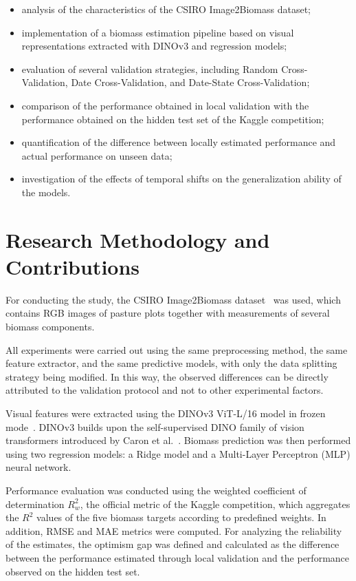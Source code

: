 \begin{itemize}
    \item analysis of the characteristics of the CSIRO Image2Biomass dataset;
    \item implementation of a biomass estimation pipeline based on visual representations extracted with DINOv3 and regression models;
    \item evaluation of several validation strategies, including Random Cross-Validation, Date Cross-Validation, and Date-State Cross-Validation;
    \item comparison of the performance obtained in local validation with the performance obtained on the hidden test set of the Kaggle competition;
    \item quantification of the difference between locally estimated performance and actual performance on unseen data;
    \item investigation of the effects of temporal shifts on the generalization ability of the models.
\end{itemize}

\section{Research Methodology and Contributions}

For conducting the study, the CSIRO Image2Biomass dataset~\cite{liao2025estimating} was used, which contains RGB images of pasture plots together with measurements of several biomass components.

All experiments were carried out using the same preprocessing method, the same feature extractor, and the same predictive models, with only the data splitting strategy being modified. In this way, the observed differences can be directly attributed to the validation protocol and not to other experimental factors.

Visual features were extracted using the DINOv3 ViT-L/16 model in frozen mode~\cite{simeoni2025dinov3}. DINOv3 builds upon the self-supervised DINO family of vision transformers introduced by Caron et al.~\cite{caron2021dino}. Biomass prediction was then performed using two regression models: a Ridge model and a Multi-Layer Perceptron (MLP) neural network.

Performance evaluation was conducted using the weighted coefficient of determination $R^2_w$, the official metric of the Kaggle competition, which aggregates the $R^2$ values of the five biomass targets according to predefined weights. In addition, RMSE and MAE metrics were computed. For analyzing the reliability of the estimates, the optimism gap was defined and calculated as the difference between the performance estimated through local validation and the performance observed on the hidden test set.

